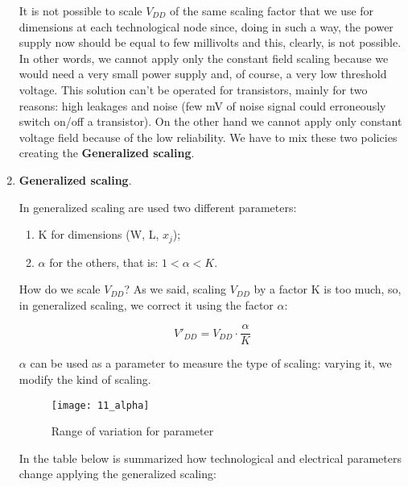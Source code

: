 \documentclass[a4paper, 12pt, twoside, openright]{report}
\begin{document}
\begin{enumerate}
It is not possible to scale $V_{DD}$ of the same scaling factor that we use for dimensions at each technological node since, doing in such a way, the power supply now should be equal to few millivolts and this, clearly, is not possible. In other words, we cannot apply only the constant field scaling because we would need a very small power supply and, of course, a very low threshold voltage. This solution can't be operated for transistors, mainly for two reasons: high leakages and noise (few mV of noise signal could erroneously switch on/off a transistor). On the other hand we cannot apply only constant voltage field because of the low reliability. We have to mix these two policies creating the \textbf{Generalized scaling}.


\item \textbf{Generalized scaling}.

In generalized scaling are used two different parameters:

	\begin{enumerate}
	\item K for dimensions (W, L, $x_{j}$);
	\item $\alpha$ for the others, that is: $1< \alpha < K$.
	\end{enumerate}

How do we scale $V_{DD}$? As we said, scaling $V_{DD}$ by a factor K is too much, so, in generalized scaling, we correct it using the factor $\alpha$:

	\begin{equation}
	V'_{DD} = V_{DD} \cdot \frac{\alpha}{K}
	\end{equation}

$\alpha$ can be used as a parameter to measure the type of scaling: varying it, we modify the kind of scaling.

	\begin{figure}[H]
	\centering
	\texttt{[image: 11\_alpha]}
	\caption{Range of variation for \alpha parameter}
	\label{}
	\end{figure}

In the table below is summarized how technological and electrical parameters change applying the generalized scaling:


\end{enumerate}
\end{document}
